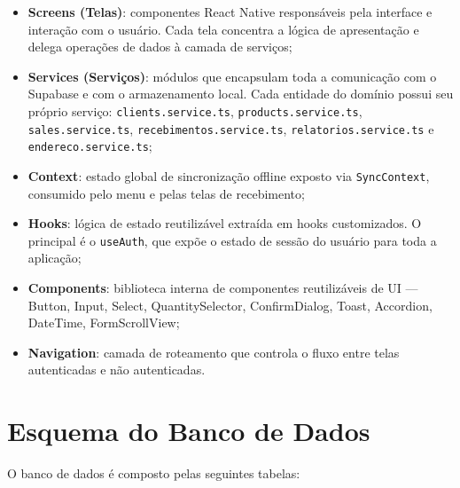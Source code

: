 \documentclass[
	12pt,				%
	oneside,			%
	a4paper,			%
	english,			%
	brazil				%
	]{abntex2}
\begin{document}
\begin{itemize}
  \item \textbf{Screens (Telas)}: componentes React Native responsáveis pela interface e interação com o usuário. Cada tela concentra a lógica de apresentação e delega operações de dados à camada de serviços;
  \item \textbf{Services (Serviços)}: módulos que encapsulam toda a comunicação com o Supabase e com o armazenamento local. Cada entidade do domínio possui seu próprio serviço: \texttt{clients.service.ts}, \texttt{products.service.ts}, \texttt{sales.service.ts}, \texttt{recebimentos.service.ts}, \texttt{relatorios.service.ts} e \texttt{endereco.service.ts};
  \item \textbf{Context}: estado global de sincronização offline exposto via \texttt{SyncContext}, consumido pelo menu e pelas telas de recebimento;
  \item \textbf{Hooks}: lógica de estado reutilizável extraída em hooks customizados. O principal é o \texttt{useAuth}, que expõe o estado de sessão do usuário para toda a aplicação;
  \item \textbf{Components}: biblioteca interna de componentes reutilizáveis de UI — Button, Input, Select, QuantitySelector, ConfirmDialog, Toast, Accordion, DateTime, FormScrollView;
  \item \textbf{Navigation}: camada de roteamento que controla o fluxo entre telas autenticadas e não autenticadas.
\end{itemize}

\section{Esquema do Banco de Dados}

O banco de dados é composto pelas seguintes tabelas:
\end{document}

